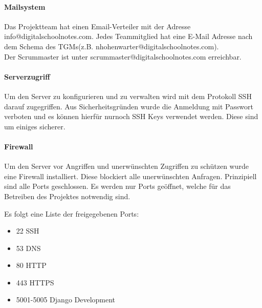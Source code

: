 \paragraph{Mailsystem}
Das Projektteam hat einen Email-Verteiler mit der Adresse info@digitalschoolnotes.com. Jedes Teammitglied hat eine E-Mail Adresse nach dem Schema des \gls{TGM}s(z.B. nhohenwarter@digitalschoolnotes.com). \\
Der Scrummaster ist unter scrummaster@digitalschoolnotes.com erreichbar.

\paragraph{Serverzugriff}
Um den Server zu konfigurieren und zu verwalten wird mit dem Protokoll \gls{SSH} darauf zugegriffen. Aus Sicherheitsgründen wurde die Anmeldung mit Passwort verboten und es können hierfür nurnoch SSH Keys verwendet werden. Diese sind um einiges sicherer.

\paragraph{Firewall}
Um den Server vor Angriffen und unerwünschten Zugriffen zu schützen wurde eine Firewall installiert. Diese blockiert alle unerwünschten Anfragen. Prinzipiell sind alle Ports geschlossen. Es werden nur Ports geöffnet, welche für das Betreiben des Projektes notwendig sind.

Es folgt eine Liste der freigegebenen Ports:
\begin{itemize}
\item 22	SSH
\item 53	\gls{DNS}
\item 80	\gls{HTTP}
\item 443	\gls{HTTPS}
\item 5001-5005 Django Development
\end{itemize}

\newpage

